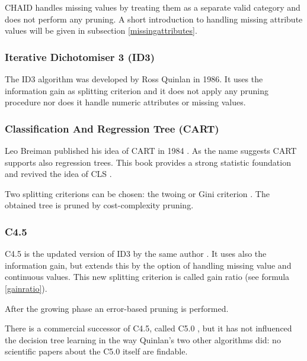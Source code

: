 CHAID handles missing values by treating them as a separate valid category and does not perform any pruning. A short introduction to handling missing attribute values will be given in subsection \ref{missingattributes}.


\subsubsection{Iterative Dichotomiser 3 (ID3)} 

The ID3 algorithm was developed by Ross Quinlan in 1986. It uses the information gain as splitting criterion and it does not apply any pruning procedure nor does it handle numeric attributes or missing values.


\subsubsection{Classification And Regression Tree (CART)} 

Leo Breiman published his idea of CART in 1984 \cite[p. 18]{rokach2008data}. As the name suggests CART supports also regression trees. This book provides a strong statistic foundation and revived the idea of CLS \cite[p. 435]{duda2012pattern}.

Two splitting criterions can be chosen: the twoing or Gini criterion \cite[p. 1]{shih1999families}. The obtained tree is pruned by cost-complexity pruning.  


\subsubsection{C4.5}

C4.5 is the updated version of ID3 by the same author \cite{Kohavi99decisiontree}. It uses also the information gain, but extends this by the option of handling missing value and continuous values. This new splitting criterion is called gain ratio (see formula \ref{gainratio}).

After the growing phase an error-based pruning is performed.



\begin{remark}
    There is a commercial successor of C4.5, called C5.0 \cite{Kohavi99decisiontree}, but it has not influenced the decision tree learning in the way Quinlan's two other algorithms did: no scientific papers about the C5.0 itself are findable. 
\end{remark}






